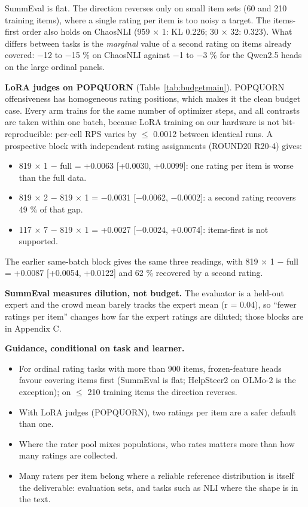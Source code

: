 \documentclass{article}
\providecommand{\tightlist}{\setlength{\itemsep}{0pt}\setlength{\parskip}{0pt}}
\begin{document}
SummEval is flat. The direction reverses only on small item sets (60 and 210 training items), where a single rating per item is too noisy a target. The items-first order also holds on ChaosNLI (959 $\times$ 1: KL 0.226; 30 $\times$ 32: 0.323). What differs between tasks is the \emph{marginal} value of a second rating on items already covered: $-$12 to $-$15 \% on ChaosNLI against $-$1 to $-$3 \% for the Qwen2.5 heads on the large ordinal panels.

\textbf{LoRA judges on POPQUORN} (Table~\ref{tab:budgetmain}). POPQUORN offensiveness has homogeneous rating positions, which makes it the clean budget case. Every arm trains for the same number of optimizer steps, and all contrasts are taken within one batch, because LoRA training on our hardware is not bit-reproducible: per-cell RPS varies by $\leq$ 0.0012 between identical runs. A prospective block with independent rating assignments (ROUND20 R20-4) gives:

\begin{itemize}
\tightlist
\item
  819 $\times$ 1 $-$ full = +0.0063 {[}+0.0030, +0.0099{]}: one rating per item is worse than the full data.
\item
  819 $\times$ 2 $-$ 819 $\times$ 1 = $-$0.0031 {[}$-$0.0062, $-$0.0002{]}: a second rating recovers 49 \% of that gap.
\item
  117 $\times$ 7 $-$ 819 $\times$ 1 = +0.0027 {[}$-$0.0024, +0.0074{]}: items-first is not supported.
\end{itemize}

The earlier same-batch block gives the same three readings, with 819 $\times$ 1 $-$ full = +0.0087 {[}+0.0054, +0.0122{]} and 62 \% recovered by a second rating.

\textbf{SummEval measures dilution, not budget.} The evaluator is a held-out expert and the crowd mean barely tracks the expert mean (r = 0.04), so ``fewer ratings per item'' changes how far the expert ratings are diluted; those blocks are in Appendix C.

\textbf{Guidance, conditional on task and learner.}

\begin{itemize}
\tightlist
\item
  For ordinal rating tasks with more than 900 items, frozen-feature heads favour covering items first (SummEval is flat; HelpSteer2 on OLMo-2 is the exception); on $\leq$ 210 training items the direction reverses.
\item
  With LoRA judges (POPQUORN), two ratings per item are a safer default than one.
\item
  Where the rater pool mixes populations, who rates matters more than how many ratings are collected.
\item
  Many raters per item belong where a reliable reference distribution is itself the deliverable: evaluation sets, and tasks such as NLI where the shape is in the text.
\end{itemize}
\end{document}
